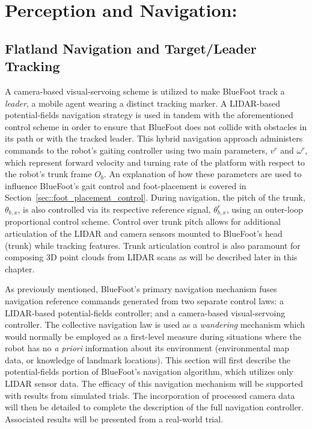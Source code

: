 \chapter{Perception and Navigation:}
	\label{ch::navigation}

	\section{Flatland Navigation and Target/Leader Tracking}
		
		A camera-based visual-servoing scheme is utilized to make BlueFoot track a \emph{leader}, \IE a mobile agent wearing a distinct tracking marker. A LIDAR-based potential-fields navigation strategy is used in tandem with the aforementioned control scheme in order to ensure that BlueFoot does not collide with obstacles in its path or with the tracked leader. This hybrid navigation approach administers commands to the robot's gaiting controller using two main parameters, $v^{r}$ and $\omega^{r}$, which represent forward velocity and turning rate of the platform with respect to the robot's trunk frame $O_{b}$. An explanation of how these parameters are used to influence BlueFoot's gait control and foot-placement is covered in Section~\ref{sec::foot_placement_control}. During navigation, the pitch of the trunk, $\theta_{b,x}$, is also controlled via its respective reference signal, $\theta_{b,x}^{r}$, using an outer-loop proportional control scheme. Control over trunk pitch allows for additional articulation of the LIDAR and camera sensors mounted to BlueFoot's head (trunk) while tracking features. Trunk articulation control is also paramount for composing 3D point clouds from LIDAR scans as will be described later in this chapter.

		As previously mentioned, BlueFoot's primary navigation mechanism fuses navigation reference commands generated from two separate control laws: a LIDAR-based potential-fields controller; and a camera-based visual-servoing controller. The collective navigation law is used as a \emph{wandering} mechanism which would normally be employed as a first-level measure during situations where the robot has no \emph{a priori} information about its environment (\IE environmental map data, or knowledge of landmark locations). This section will first describe the potential-fields portion of BlueFoot's navigation algorithm, which utilizes only LIDAR sensor data. The efficacy of this navigation mechanism will be supported with results from simulated trials. The incorporation of processed camera data will then be detailed to complete the description of the full navigation controller. Associated results will be presented from a real-world trial.


